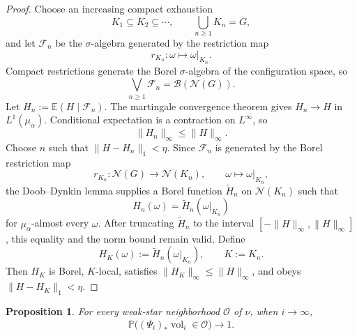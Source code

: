 \documentclass[12pt]{amsart}
\newtheorem{proposition}[proposition]{Proposition}
\theoremstyle{definition}
\newcommand{\vol}{\operatorname{vol}}
\newcommand{\cN}{\mathcal N}
\newcommand{\cB}{\mathcal B}
\newcommand{\cO}{\mathcal O}
\newcommand{\1}{\mathbf 1}
\newcommand{\dbar}{\overline{\vol}}
\begin{document}
\begin{proof}
Choose an increasing compact exhaustion
\[
 K_1\subseteq K_2\subseteq\cdots,
 \qquad \bigcup_{n\geq1}K_n=G,
\]
and let $\mathscr F_n$ be the $\sigma$-algebra generated by the restriction map
\[
 r_{K_n}:\omega\longmapsto\omega|_{K_n}.
\]
Compact restrictions generate the Borel $\sigma$-algebra of the configuration
space, so
\[
 \bigvee_{n\geq1}\mathscr F_n=\cB(\cN(G)).
\]
Let $H_n:=\mathbb E(H\mid\mathscr F_n)$.
The martingale convergence theorem gives $H_n\to H$ in $L^1(\mu_\alpha)$. Conditional expectation is a contraction on $L^\infty$, so
\[
 \|H_n\|_\infty\leq\|H\|_\infty.
\]
Choose $n$ such that $\|H-H_n\|_1<\eta$. Since $\mathscr F_n$ is generated by the Borel restriction map
\[
 r_{K_n}:\cN(G)\to\cN(K_n),\qquad\omega\mapsto\omega|_{K_n},
\]
the Doob--Dynkin lemma supplies a Borel function $\widetilde H_n$ on $\cN(K_n)$ such that
\[
 H_n(\omega)=\widetilde H_n(\omega|_{K_n})
\]
for $\mu_\alpha$-almost every $\omega$. After truncating $\widetilde H_n$ to the interval $[-\|H\|_\infty,\|H\|_\infty]$, this equality and the norm bound remain valid. Define
\[
 H_K(\omega):=\widetilde H_n(\omega|_{K_n}),\qquad K:=K_n.
\]
Then $H_K$ is Borel, $K$-local, satisfies $\|H_K\|_\infty\leq\|H\|_\infty$, and obeys $\|H-H_K\|_1<\eta$.
\end{proof}

\begin{proposition}\label{prop:empirical-factor}
For every weak-star neighborhood $\cO$ of $\nu$, when $i \to \infty$,
\[
 \mathbb P\bigl((\Psi_i)_*\dbar_i\in\cO\bigr)\longrightarrow1.
\]
\end{proposition}
\end{document}
